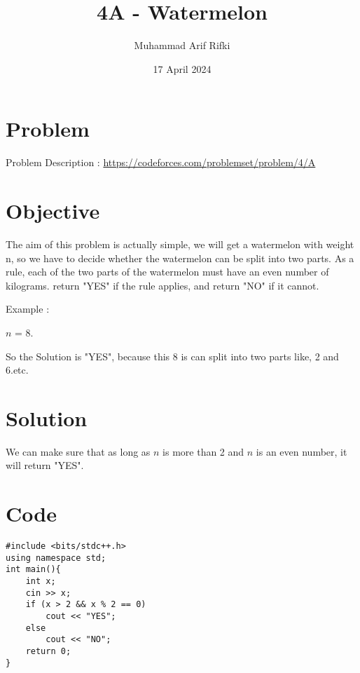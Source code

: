 \documentclass{article}
\title{4A -  Watermelon}
\author{Muhammad Arif Rifki}
\date{17 April 2024}
\begin{document}
\maketitle


\section{Problem}

Problem Description : \href{https://codeforces.com/problemset/problem/4/A}{https://codeforces.com/problemset/problem/4/A}

\section{Objective}

The aim of this problem is actually simple, we will get a watermelon with weight n, so we have to decide whether the watermelon can be split into two parts. As a rule, each of the two parts of the watermelon must have an even number of kilograms. return "YES" if the rule applies, and return "NO" if it cannot.

Example : 

$n$ = 8.

So the Solution is "YES", because this 8 is can split into two parts like, 2 and 6.etc.

\section{Solution}

We can make sure that as long as $n$ is more than 2 and $n$ is an even number, it will return "YES".


\newpage
\section{Code}

\begin{lstlisting}
#include <bits/stdc++.h>
using namespace std;
int main(){
    int x;
    cin >> x;
    if (x > 2 && x % 2 == 0)
        cout << "YES";
    else
        cout << "NO";
    return 0;
}

\end{lstlisting}
\end{document}
